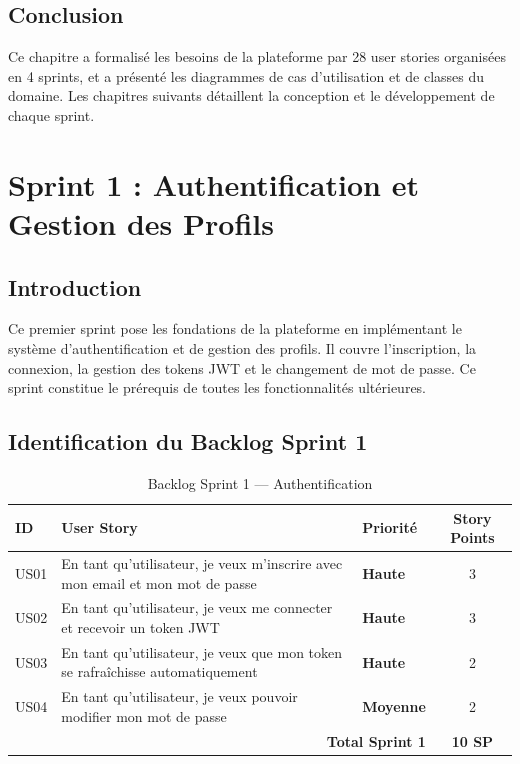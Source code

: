\documentclass[12pt,a4paper]{report}
\begin{document}
\section{Conclusion}

Ce chapitre a formalisé les besoins de la plateforme par 28 user stories organisées
en 4 sprints, et a présenté les diagrammes de cas d'utilisation et de classes du
domaine. Les chapitres suivants détaillent la conception et le développement de
chaque sprint.

\chapter{Sprint 1 : Authentification et Gestion des Profils}

\section{Introduction}

Ce premier sprint pose les fondations de la plateforme en implémentant le système
d'authentification et de gestion des profils. Il couvre l'inscription, la connexion,
la gestion des tokens JWT et le changement de mot de passe. Ce sprint constitue
le prérequis de toutes les fonctionnalités ultérieures.

\section{Identification du Backlog Sprint 1}

\begin{table}[H]
\centering
\caption{Backlog Sprint 1 — Authentification}
\begin{tabularx}{\textwidth}{|l|X|l|c|}
\hline
\rowcolor{indigolite!60}
\textbf{ID} & \textbf{User Story} & \textbf{Priorité} & \textbf{Story Points} \\
\hline
US01 & En tant qu'utilisateur, je veux m'inscrire avec mon email et mon mot de passe &
  \textcolor{prioH}{\bfseries Haute} & 3 \\
\hline
US02 & En tant qu'utilisateur, je veux me connecter et recevoir un token JWT &
  \textcolor{prioH}{\bfseries Haute} & 3 \\
\hline
US03 & En tant qu'utilisateur, je veux que mon token se rafraîchisse automatiquement &
  \textcolor{prioH}{\bfseries Haute} & 2 \\
\hline
US04 & En tant qu'utilisateur, je veux pouvoir modifier mon mot de passe &
  \textcolor{prioM}{\bfseries Moyenne} & 2 \\
\hline
\multicolumn{3}{|r|}{\textbf{Total Sprint 1}} & \textbf{10 SP} \\
\hline
\end{tabularx}
\end{table}
\end{document}
